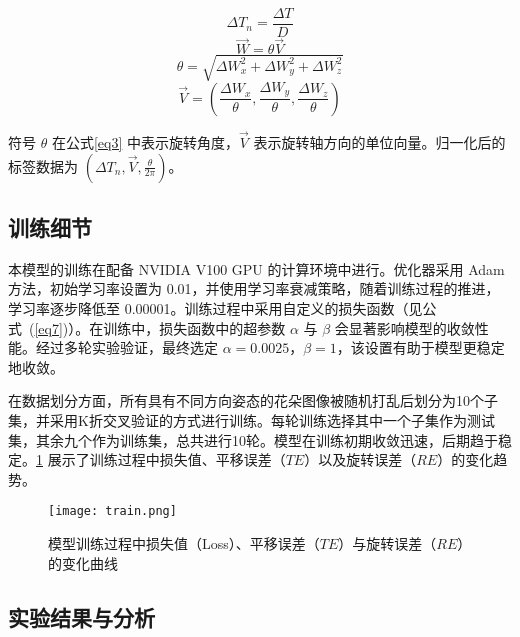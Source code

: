 \begin{equation}
	\label{eq1}
	\Delta T_{n} = \frac{\Delta T}{D}
\end{equation}
\begin{equation}
	\label{eq2}
	\overrightarrow{W} = \theta\overrightarrow{V}
\end{equation}
\begin{equation}
	\label{eq3}
	\theta = \sqrt{\Delta W_{x}^{2} + \Delta W_{y}^{2} + \Delta W_{z}^{2}}
\end{equation}
\begin{equation}
	\label{eq4}
	\overrightarrow{V} = \left(\frac{\Delta W_{x}}{\theta},\frac{\Delta W_{y}}{\theta},\frac{\Delta W_{z}}{\theta}\right)
\end{equation}

符号 $\theta$ 在公式\cref{eq3} 中表示旋转角度，$\overrightarrow{V}$ 表示旋转轴方向的单位向量。归一化后的标签数据为 $(\Delta T_{n}, \overrightarrow{V}, \frac{\theta}{2\pi})$。



\subsection{训练细节}

本模型的训练在配备 NVIDIA V100 GPU 的计算环境中进行。优化器采用 Adam 方法，初始学习率设置为 0.01，并使用学习率衰减策略，随着训练过程的推进，学习率逐步降低至 0.00001。训练过程中采用自定义的损失函数（见公式~(\ref{eq7})）。在训练中，损失函数中的超参数 $\alpha$ 与 $\beta$ 会显著影响模型的收敛性能。经过多轮实验验证，最终选定 $\alpha = 0.0025$，$\beta = 1$，该设置有助于模型更稳定地收敛。

在数据划分方面，所有具有不同方向姿态的花朵图像被随机打乱后划分为10个子集，并采用K折交叉验证的方式进行训练。每轮训练选择其中一个子集作为测试集，其余九个作为训练集，总共进行10轮。模型在训练初期收敛迅速，后期趋于稳定。\cref{fig:effective_r_3} 展示了训练过程中损失值、平移误差（$TE$）以及旋转误差（$RE$）的变化趋势。

\begin{figure}[htb]
	\texttt{[image: train.png]}
	\caption[模型训练过程中损失值（Loss）、平移误差（$TE$）与旋转误差（$RE$）的变化曲线]{模型训练过程中损失值（Loss）、平移误差（$TE$）与旋转误差（$RE$）的变化曲线} %
	\label{fig:effective_r_3}
\end{figure}




\subsection{实验结果与分析}

